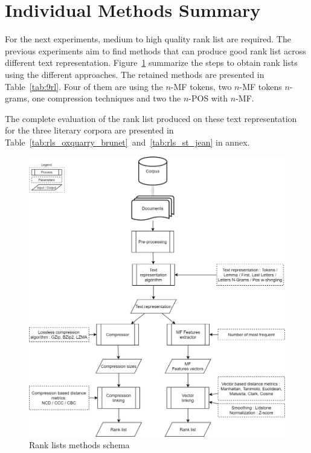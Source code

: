 \section{Individual Methods Summary \label{sec:individual_methods_summary}}

For the next experiments, medium to high quality rank list are required.
The previous experiments aim to find methods that can produce good rank list across different text representation.
Figure~\ref{fig:schema-rank_lists} summarize the steps to obtain rank lists using the different approaches.
The retained methods are presented in Table~\ref{tab:9rl}.
Four of them are using the $n$-MF tokens, two $n$-MF tokens $n$-grams, one compression techniques and two the $n$-POS with $n$-MF.

The complete evaluation of the rank list produced on these text representation for the three literary corpora are presented in Table~\ref{tab:rls_oxquarry_brunet}~and~\ref{tab:rls_st_jean} in annex.

\begin{figure}
  \centering
  \caption{Rank lists methods schema}
  \label{fig:schema-rank_lists}
  \includegraphics[width=0.82\linewidth]{img/schema-rank_lists.png}
\end{figure}

